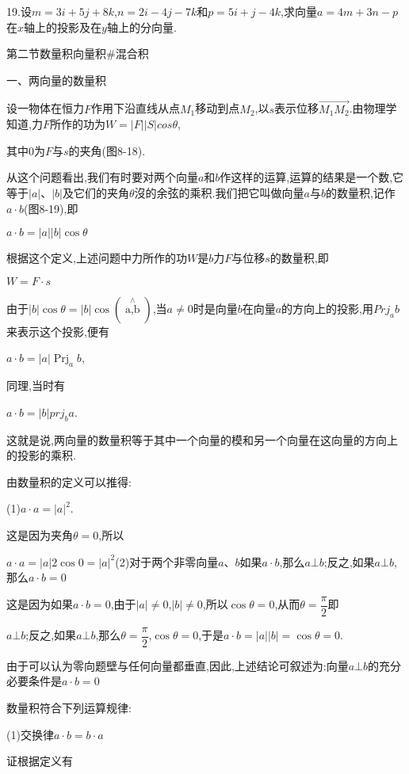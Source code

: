 \documentclass[oneside]{book}
\begin{document}
19.设$m = 3i + 5j + 8k$,$n = 2i - 4j - 7k$和$p = 5i + j - 4k$,求向量$a = 4m + 3n - p$在$x$轴上的投影及在$y$轴上的分向量.

第二节数量积向量积$\# $混合积

一、两向量的数量积

设一物体在恒力$F$作用下沿直线从点${M_1}$移动到点${M_2}$,以$s$表示位移$\overrightarrow {{M_1}{M_2}} $.由物理学知道,力$F$所作的功为$W = \left| F \right||S|cos\theta $,

其中0为$F$与$s$的夹角(图8-18).

从这个问题看出,我们有时要对两个向量$a$和$b$作这样的运算,运算的结果是一个数,它等于$|a|$、$|b|$及它们的夹角$\theta $沒的余弦的乘积.我们把它叫做向量$a$与$b$的数量积,记作$a \cdot b$(图8-19),即

$a \cdot b = |a||b|\cos \theta $

根据这个定义,上述问题中力所作的功$W$是$b$力$F$与位移$s$的数量积,即

$W = F \cdot s$

由于$|b|\cos\theta  = |b|\cos(\mathop {a,b}\limits^ \wedge  )$,当$a \ne 0$时是向量$b$在向量$a$的方向上的投影,用${{Pr}}{{{j}}_a}b$来表示这个投影,便有

$a \cdot b = |a|{\operatorname{Prj} _a}b$,

同理,当时有

$a \cdot b = |b|pr{j_b}a$.

这就是说,两向量的数量积等于其中一个向量的模和另一个向量在这向量的方向上的投影的乘积.

由数量积的定义可以推得:

(1)$a \cdot a = {\left| a \right|^2}$.

这是因为夹角$\theta  = 0$,所以

$a \cdot a=|a| 2 \cos 0=|a|^{2}$(2)对于两个非零向量$a$、$b$如果$a \cdot b$,那么$a \bot b$;反之,如果$a \bot b$,那么$a \cdot b = 0$

这是因为如果$a \cdot b = 0$,由于$|a| \ne 0$,$|b| \ne 0$,所以$\cos \theta  = 0$,从而$\theta  = \dfrac{\pi }{2}$即

$a \bot b$;反之,如果$a \bot b$,那么$\theta  = \dfrac{\pi }{2}$,$\cos \theta  = 0$,于是$a \cdot b = |a||b| = \cos \theta  = 0$.

由于可以认为零向题壁与任何向量都垂直,因此,上述结论可叙述为:向量$a \bot b$的充分必要条件是$a \cdot b = 0$

数量积符合下列运算规律:

(1)交换律$a \cdot b = b \cdot a$

证\quad 根据定义有
\end{document}
